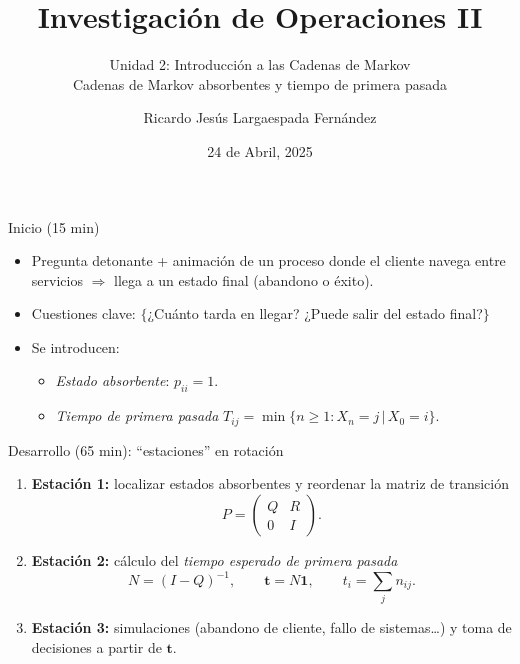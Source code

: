 \documentclass{beamer}
\title{Investigación de Operaciones II}
\subtitle{Unidad 2: Introducción a las Cadenas de Markov\\Cadenas de Markov absorbentes y tiempo de primera pasada}
\author[Ricardo Largaespada]{Ricardo Jesús Largaespada Fernández}
\institute[UNI]{Ingeniería de Sistemas, DACTIC, UNI}
\date{24 de Abril, 2025}
\begin{document}
\begin{frame}{Inicio (15 min)}  
\begin{itemize}
    \item Pregunta detonante + animación de un proceso donde el cliente navega entre servicios  
          \(\Rightarrow\) llega a un \alert{estado final} (abandono o éxito).
    \item Cuestiones clave:  
          \(\bigl\lbrace\)¿Cuánto tarda en llegar? \quad ¿Puede salir del estado final?\(\bigr\rbrace\)
    \item Se introducen:  
        \begin{itemize}
            \item \textit{Estado absorbente}: \(p_{ii}=1\).
            \item \textit{Tiempo de primera pasada} \(T_{ij}=\min\{n\ge1 : X_n=j\,|\,X_0=i\}\).
        \end{itemize}
\end{itemize}

\end{frame}

\begin{frame}{Desarrollo (65 min): “estaciones” en rotación}
\begin{enumerate}
    \item \textbf{Estación 1:} localizar estados absorbentes y reordenar la matriz de transición  
          \[
              P=\begin{pmatrix}
                     Q & R\\[2pt]
                     0 & I
                 \end{pmatrix}\!.
          \]
    \item \textbf{Estación 2:} cálculo del \emph{tiempo esperado de primera pasada}  
          \[
              N=(I-Q)^{-1}, \qquad 
              \bm{t}=N\bm{1}, \qquad 
              t_i=\sum_{j} n_{ij}.
          \]
    \item \textbf{Estación 3:} simulaciones (abandono de cliente, fallo de sistemas…) y toma de decisiones a partir de \(\bm{t}\).
\end{enumerate}
\end{frame}

\end{document}
